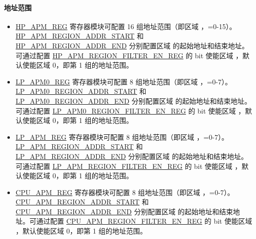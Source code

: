 \documentclass[main\_\_CN.tex]{subfiles}
\begin{document}
\paragraph{地址范围}
\begin{itemize}
    \item \hyperref[sec:permctrl-reg-hp]{HP\_APM\_REG} 寄存器模块可配置 16 组地址范围（即区域 ，=0-15）。\hyperref[regdesc:HPAPMREGIONNADDRSTARTREG]{HP\_APM\_REGION\_ADDR\_START} 和 \hyperref[regdesc:HPAPMREGIONNADDRENDREG]{HP\_APM\_REGION\_ADDR\_END} 分别配置区域  的起始地址和结束地址。可通过配置 \hyperref[fielddesc:HPAPMREGIONFILTEREN]{HP\_APM\_REGION\_FILTER\_EN\_REG} 的 bit  使能区域 ，默认使能区域 0，即第 1 组的地址范围。

    \item \hyperref[sec:permctrl-reg-lp0]{LP\_APM0\_REG} 寄存器模块可配置 8 组地址范围（即区域 ，=0-7）。\hyperref[fielddesc:LPAPM0REGIONNADDRSTART]{LP\_APM0\_REGION\_ADDR\_START} 和 \hyperref[fielddesc:LPAPM0REGIONNADDREND]{LP\_APM0\_REGION\_ADDR\_END} 分别配置区域  的起始地址和结束地址。可通过配置 \hyperref[fielddesc:LPAPM0REGIONFILTEREN]{LP\_APM0\_REGION\_FILTER\_EN\_REG} 的 bit  使能区域 ，默认使能区域 0，即第 1 组的地址范围。

    \item \hyperref[sec:permctrl-reg-lp]{LP\_APM\_REG} 寄存器模块可配置 8 组地址范围（即区域 ，=0-7）。\hyperref[fielddesc:LPAPMREGIONNADDRSTART]{LP\_APM\_REGION\_ADDR\_START} 和 \hyperref[fielddesc:LPAPMREGIONNADDREND]{LP\_APM\_REGION\_ADDR\_END} 分别配置区域  的起始地址和结束地址。可通过配置 \hyperref[fielddesc:LPAPMREGIONFILTEREN]{LP\_APM\_REGION\_FILTER\_EN\_REG} 的 bit  使能区域 ，默认使能区域 0，即第 1 组的地址范围。

    \item \hyperref[sec:permctrl-reg-cpu]{CPU\_APM\_REG} 寄存器模块可配置 8 组地址范围（即区域 ，=0-7）。\hyperref[fielddesc:CPUAPMREGIONNADDRSTART]{CPU\_APM\_REGION\_ADDR\_START} 和 \hyperref[fielddesc:CPUAPMREGIONNADDREND]{CPU\_APM\_REGION\_ADDR\_END} 分别配置区域  的起始地址和结束地址。可通过配置 \hyperref[fielddesc:CPUAPMREGIONFILTEREN]{CPU\_APM\_REGION\_FILTER\_EN\_REG} 的 bit  使能区域 ，默认使能区域 0，即第 1 组的地址范围。

\end{itemize}
\end{document}
